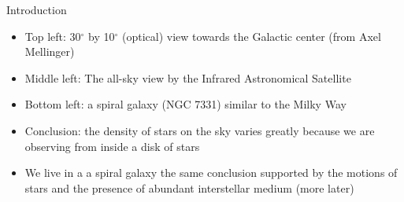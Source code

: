 \documentclass[letterpaper,landscape]{slides}
\begin{document}
\begin{slide}
{\begin{minipage}[t]{12.5cm}
\begin{center}
\vskip -1in
{\large \color{red} Introduction }
\end{center}

\begin{itemize}
\item {\color{blue} Top left:} 30$^\circ$ by 10$^\circ$ (optical) view towards
  the Galactic center (from Axel Mellinger)
\item {\color{blue} Middle left:} The all-sky view by the Infrared
                                  Astronomical Satellite
\item {\color{blue} Bottom left:} a spiral galaxy (NGC 7331) similar to the
                                  Milky Way
\item {\color{red} Conclusion:} the density of stars on the sky varies greatly
                    because we are observing from inside a disk of stars
\item {\color{blue} We live in a a spiral galaxy} the same conclusion
           supported by the motions of stars and the presence of abundant 
           interstellar medium (more later)
\end{itemize}

\end{minipage}}
\vfill 
\end{slide}
\end{document}
